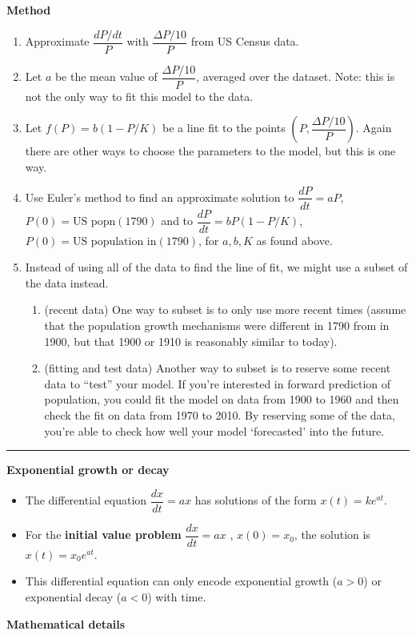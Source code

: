 \documentclass[12pt,letterpaper,noanswers]{exam}
\begin{document}
\noindent\textbf{Method}
\begin{enumerate}
    \item Approximate $\dfrac{dP/dt}{P}$ with $\dfrac{\Delta P/10}{P}$ from US Census data.
    \item Let $a$ be the mean value of $\dfrac{\Delta P/10}{P}$, averaged over the dataset.  Note: this is not the only way to fit this model to the data.
    \item Let $f(P) = b(1-P/K)$ be a line fit to the points $(P,\dfrac{\Delta P/10}{P})$.  Again there are other ways to choose the parameters to the model, but this is one way.
    \item Use Euler's method to find an approximate solution to $\dfrac{dP}{dt} = aP$, $P(0) =\text{US popn}(1790)$ and to $\dfrac{dP}{dt} = bP(1-P/K)$, $P(0) =\text{US population in}(1790)$, for $a,b,K$ as found above.
    \item Instead of using all of the data to find the line of fit, we might use a subset of the data instead.
    \begin{enumerate}
        \item (recent data) One way to subset is to only use more recent times (assume that the population growth mechanisms were different in 1790 from in 1900, but that 1900 or 1910 is reasonably similar to today).
        \item (fitting and test data)  Another way to subset is to reserve some recent data to ``test'' your model.  If you're interested in forward prediction of population, you could fit the model on data from 1900 to 1960 and then check the fit on data from 1970 to 2010.  By reserving some of the data, you're able to check how well your model `forecasted' into the future.
    \end{enumerate}
\end{enumerate}

\vspace{1in}

\eject
\vspace{0.2cm}
\hrule
\vspace{0.2cm}

\noindent\textbf{Exponential growth or decay}
\begin{tcolorbox}
\begin{itemize}
\itemsep0em
    \item The differential equation $\dfrac{dx}{dt} = ax$ has solutions of the form $x(t) = ke^{at}$.  
    \item For the \textbf{initial value problem}  $\dfrac{dx}{dt} = ax$ , $x(0) = x_0$, the solution is $x(t) = x_0e^{at}$.
    \item This differential equation can only encode exponential growth ($a>0$) or exponential decay ($a<0$) with time.  
\end{itemize}
\end{tcolorbox}
\noindent\textbf{Mathematical details}
\vspace{0.2cm}
\end{document}
